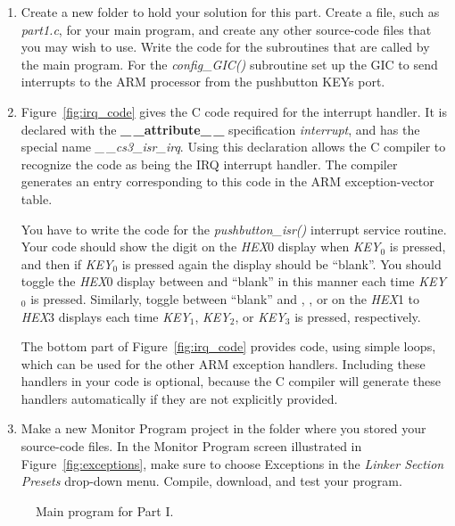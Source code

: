 \documentclass[epsfig,10pt,fullpage]{article}
\begin{document}
\begin{enumerate}
\item Create a new folder to hold your solution for this part. Create a
file, such as {\it part1.c}, for your main program, and create any other source-code files 
that you may wish to use.  Write the code for the subroutines that are called by the 
main program. For the {\it config\_GIC()} subroutine set up the
GIC to send interrupts to the ARM processor from the pushbutton KEYs port. 

\item 
Figure~\ref{fig:irq_code} gives the C code required for the interrupt handler. 
It is declared with the {\bf \_$\,$\_attribute\_$\,$\_} specification {\it interrupt}, 
and has the special name 
{\it \_$\,$\_cs3\_isr\_irq}.  Using this declaration allows the C compiler to recognize the 
code as being the IRQ interrupt handler. The compiler generates an entry corresponding
to this code in the ARM exception-vector table. 
  
You have to write the code for the {\it pushbutton\_isr()} interrupt service routine.
Your code should show the digit  on the {\it HEX}0 display when {\it KEY}$_0$ is
pressed, and then if {\it KEY}$_0$ is pressed again the display should be ``blank''. You should
toggle the {\it HEX}0 display between  and ``blank'' in this manner each time 
{\it KEY}$_0$ is pressed. Similarly, toggle between ``blank'' and , , or 
 on the {\it HEX}1 to {\it HEX}3 displays each time {\it KEY}$_1$, {\it KEY}$_2$,
or {\it KEY}$_3$ is pressed, respectively. 

The bottom part of Figure~\ref{fig:irq_code} provides code, using simple loops, which can 
be used for the other ARM exception handlers. Including these handlers in your code is 
optional, because the C compiler will generate these handlers automatically if they are 
not explicitly provided. 

\item
Make a new Monitor Program project in the folder where you stored your source-code files.
In the Monitor Program screen illustrated in Figure~\ref{fig:exceptions}, make sure 
to choose {\sf Exceptions} in the {\it Linker Section Presets} drop-down menu.
Compile, download, and test your program. 
\end{enumerate}

\begin{figure}[H]
\begin{center}

\end{center}
\caption{Main program for Part I.}
\label{fig:code}
\end{figure}
\end{document}
